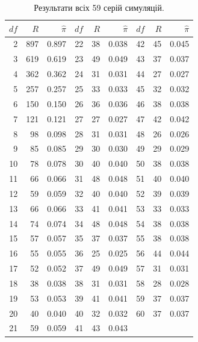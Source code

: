 \documentclass[11pt,a4paper]{article}
\begin{document}
\begin{table}[H]
\centering
\small
\caption{Результати всіх 59 серій симуляцій.}
\begin{tabular}{rrr@{\qquad}rrr@{\qquad}rrr}
\toprule
$df$ & $R$ & $\widehat\pi$ & $df$ & $R$ & $\widehat\pi$ & $df$ & $R$ & $\widehat\pi$ \\
\midrule
2 & 897 & 0.897 & 22 & 38 & 0.038 & 42 & 45 & 0.045 \\
3 & 619 & 0.619 & 23 & 49 & 0.049 & 43 & 37 & 0.037 \\
4 & 362 & 0.362 & 24 & 31 & 0.031 & 44 & 27 & 0.027 \\
5 & 257 & 0.257 & 25 & 33 & 0.033 & 45 & 32 & 0.032 \\
6 & 150 & 0.150 & 26 & 36 & 0.036 & 46 & 38 & 0.038 \\
7 & 121 & 0.121 & 27 & 27 & 0.027 & 47 & 42 & 0.042 \\
8 & 98 & 0.098 & 28 & 31 & 0.031 & 48 & 26 & 0.026 \\
9 & 85 & 0.085 & 29 & 30 & 0.030 & 49 & 29 & 0.029 \\
10 & 78 & 0.078 & 30 & 40 & 0.040 & 50 & 38 & 0.038 \\
11 & 66 & 0.066 & 31 & 48 & 0.048 & 51 & 40 & 0.040 \\
12 & 59 & 0.059 & 32 & 40 & 0.040 & 52 & 39 & 0.039 \\
13 & 66 & 0.066 & 33 & 41 & 0.041 & 53 & 33 & 0.033 \\
14 & 74 & 0.074 & 34 & 48 & 0.048 & 54 & 38 & 0.038 \\
15 & 57 & 0.057 & 35 & 37 & 0.037 & 55 & 38 & 0.038 \\
16 & 55 & 0.055 & 36 & 25 & 0.025 & 56 & 44 & 0.044 \\
17 & 52 & 0.052 & 37 & 49 & 0.049 & 57 & 31 & 0.031 \\
18 & 38 & 0.038 & 38 & 31 & 0.031 & 58 & 28 & 0.028 \\
19 & 53 & 0.053 & 39 & 41 & 0.041 & 59 & 37 & 0.037 \\
20 & 40 & 0.040 & 40 & 32 & 0.032 & 60 & 37 & 0.037 \\
21 & 59 & 0.059 & 41 & 43 & 0.043 &  &  &  \\
\bottomrule
\end{tabular}
\end{table}
\end{document}
